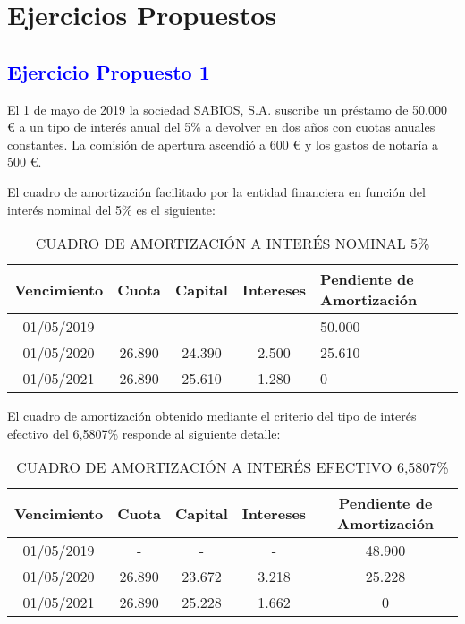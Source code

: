 \section{Ejercicios Propuestos}

\subsection*{\textcolor{blue}{Ejercicio Propuesto 1}}

El 1 de mayo de 2019 la sociedad SABIOS, S.A. suscribe un préstamo de 50.000 € a un tipo de interés anual del 5\% a devolver en dos años con cuotas anuales constantes. La comisión de apertura ascendió a 600 € y los gastos de notaría a 500 €.

El cuadro de amortización facilitado por la entidad financiera en función del interés nominal del 5\% es el siguiente:

\begin{table}[H]
\centering
\begin{tabular}{|c|c|c|c|p{2cm}|}
\hline
\textbf{Vencimiento} & \textbf{Cuota} & \textbf{Capital} & \textbf{Intereses} & \textbf{Pendiente de Amortización} \\ \hline
01/05/2019 & - & - & - & 50.000 \\ \hline
01/05/2020 & 26.890 & 24.390 & 2.500 & 25.610 \\ \hline
01/05/2021 & 26.890 & 25.610 & 1.280 & 0 \\ \hline
\end{tabular}
\caption{CUADRO DE AMORTIZACIÓN A INTERÉS NOMINAL 5\%}
\end{table}

El cuadro de amortización obtenido mediante el criterio del tipo de interés efectivo del 6,5807\% responde al siguiente detalle:

\begin{table}[H]
\centering
\begin{tabular}{|c|c|c|c|c|}
\hline
\textbf{Vencimiento} & \textbf{Cuota} & \textbf{Capital} & \textbf{Intereses} & \textbf{Pendiente de Amortización} \\ \hline
01/05/2019 & - & - & - & 48.900 \\ \hline
01/05/2020 & 26.890 & 23.672 & 3.218 & 25.228 \\ \hline
01/05/2021 & 26.890 & 25.228 & 1.662 & 0 \\ \hline
\end{tabular}
\caption{CUADRO DE AMORTIZACIÓN A INTERÉS EFECTIVO 6,5807\%}
\end{table}

